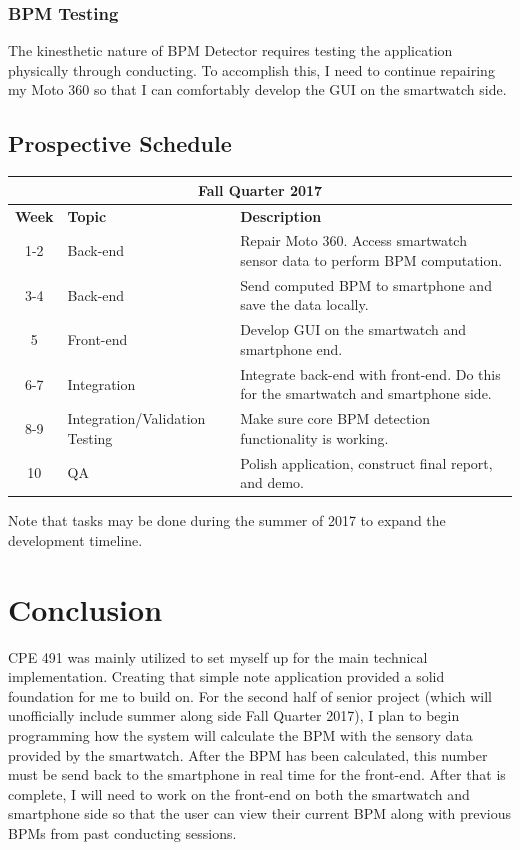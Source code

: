 \documentclass[12pt]{article}
\begin{document}
\subsubsection{BPM Testing}
The kinesthetic nature of BPM Detector requires testing the application physically through conducting. To accomplish this, I need to continue repairing my Moto 360 so that I can comfortably develop the GUI on the smartwatch side.

\subsection{Prospective Schedule} 
\begin{center}
  \begin{tabular}{ |c|p{1.6in}|p{4in}| } 
  \hline 
  \multicolumn{3}{|c|}{\textbf{Fall Quarter 2017}} \\
  \hline
  \textbf{Week} & \textbf{Topic} & \textbf{Description} \\ 
  \hline
  1-2 & Back-end & Repair Moto 360. Access smartwatch sensor data to perform BPM computation. \\
  \hline
  3-4 & Back-end & Send computed BPM to smartphone and save the data locally. \\
  \hline
  5 & Front-end & Develop GUI on the smartwatch and smartphone end. \\
  \hline 
  6-7 & Integration & Integrate back-end with front-end. Do this for the smartwatch and smartphone side. \\
  \hline
  8-9 & Integration/Validation Testing & Make sure core BPM detection functionality is working. \\
  \hline
  10 & QA & Polish application, construct final report, and demo. \\
  \hline
  \end{tabular}
\end{center}
Note that tasks may be done during the summer of 2017 to expand the development timeline.  

\newpage

\section{Conclusion}
CPE 491 was mainly utilized to set myself up for the main technical implementation. Creating that simple note application provided a solid foundation for me to build on. For the second half of senior project (which will unofficially include summer along side Fall Quarter 2017), I plan to begin programming how the system will calculate the BPM with the sensory data provided by the smartwatch. After the BPM has been calculated, this number must be send back to the smartphone in real time for the front-end. After that is complete, I will need to work on the front-end on both the smartwatch and smartphone side so that the user can view their current BPM along with previous BPMs from past conducting sessions.
\end{document}
